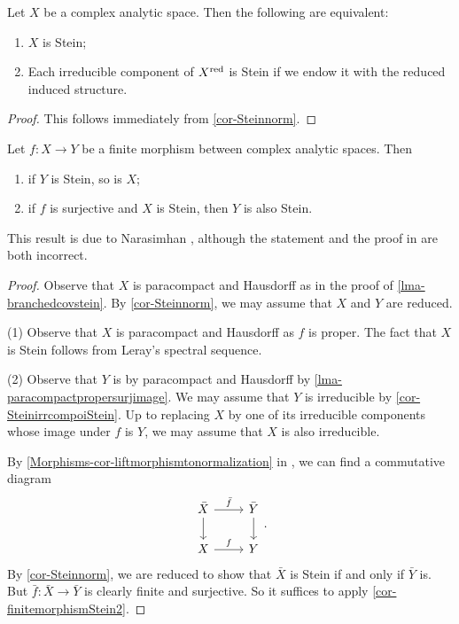 \begin{corollary}\label{cor-SteinirrcompoiStein}
    Let $X$ be a complex analytic space. Then the following are equivalent:
    \begin{enumerate}
        \item $X$ is Stein;
        \item Each irreducible component of $X^{\operatorname{red}}$ is Stein if we endow it with the reduced induced structure.
    \end{enumerate}
\end{corollary}
\begin{proof}
    This follows immediately from \cref{cor-Steinnorm}.
\end{proof}

\begin{corollary}
    Let $f:X\rightarrow Y$ be a finite morphism between complex analytic spaces. Then 
    \begin{enumerate}
        \item if $Y$ is Stein, so is $X$;
        \item if $f$ is surjective and $X$ is Stein, then $Y$ is also Stein.
    \end{enumerate}
\end{corollary}
This result is due to Narasimhan \cite{Nar62}, although the statement and the proof in \cite{Nar62} are both incorrect.
\begin{proof}
    Observe that $X$ is paracompact and Hausdorff as in the proof of \cref{lma-branchedcovstein}. By \cref{cor-Steinnorm}, we may assume that $X$ and $Y$ are reduced.

    (1) Observe that $X$ is paracompact and Hausdorff as $f$ is proper. The fact that $X$ is Stein follows from Leray's spectral sequence.

    (2) Observe that $Y$ is by paracompact and Hausdorff by \cref{lma-paracompactpropersurjimage}.
    We may assume that $Y$ is irreducible by \cref{cor-SteinirrcompoiStein}. Up to replacing $X$ by one of its irreducible components whose image under $f$ is $Y$, we may assume that $X$ is also irreducible.
    
    By \cref{Morphisms-cor-liftmorphismtonormalization} in  , we can find a commutative diagram 
    \[
        \begin{tikzcd}
            \bar{X} \arrow[r, "\bar{f}"] \arrow[d] & \bar{Y} \arrow[d] \\
            X \arrow[r, "f"]                       & Y                
        \end{tikzcd}.  
    \]
    By \cref{cor-Steinnorm}, we are reduced to show that $\bar{X}$ is Stein if and only if $\bar{Y}$ is. But $\bar{f}:\bar{X}\rightarrow \bar{Y}$ is clearly finite and surjective. So it suffices to apply \cref{cor-finitemorphismStein2}.
\end{proof}

